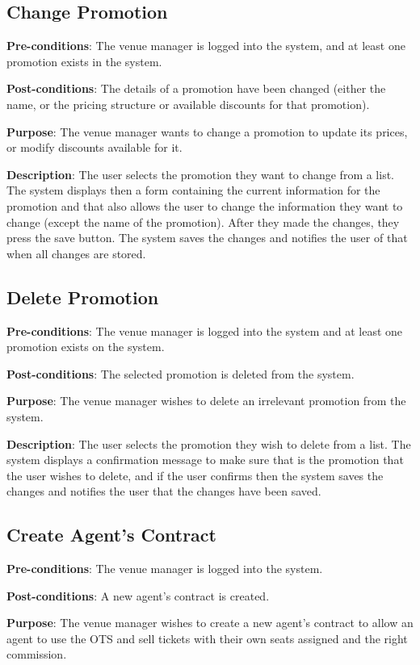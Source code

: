 \subsection{Change Promotion}
\textbf{Pre-conditions}: The venue manager is logged into the system, and at least one promotion exists in the system.

\textbf{Post-conditions}: The details of a promotion have been changed (either the name, or the pricing structure or available discounts for that promotion).

\textbf{Purpose}: The venue manager wants to change a promotion to update its prices, or modify discounts available for it.

\textbf{Description}: The user selects the promotion they want to change from a list. The system displays then a form containing the current information for the promotion and that also allows the user to change the information they want to change (except the name of the promotion). After they made the changes, they press the save button. The system saves the changes and notifies the user of that when all changes are stored.

\subsection{Delete Promotion}
\textbf{Pre-conditions}: The venue manager is logged into the system and at least one promotion exists on the system.

\textbf{Post-conditions}: The selected promotion is deleted from the system.

\textbf{Purpose}: The venue manager wishes to delete an irrelevant promotion from the system.

\textbf{Description}: The user selects the promotion they wish to delete from a list. The system displays a confirmation message to make sure that is the promotion that the user wishes to delete, and if the user confirms then the system saves the changes and notifies the user that the changes have been saved.

\subsection{Create Agent's Contract}
\textbf{Pre-conditions}: The venue manager is logged into the system.

\textbf{Post-conditions}: A new agent's contract is created.

\textbf{Purpose}: The venue manager wishes to create a new agent's contract to allow an agent to use the OTS and sell tickets with their own seats assigned and the right commission.

